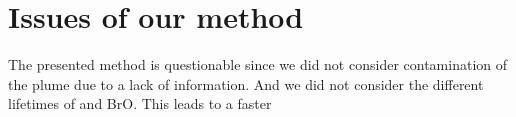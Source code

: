 \documentclass  [
  paper    = a4,
  BCOR     = 10mm,
  twoside,
  fontsize = 12pt,
  fleqn,
  toc      = bibnumbered,
  toc      = listofnumbered,
  numbers  = noendperiod,
  headings = normal,
  listof   = leveldown,
  version  = 3.03
]                                       {scrreprt}
\begin{document}
	\begin{small}	
%
%
 	
 \end{small}
	\chapter{Issues of our method}
	The presented method is questionable since we did not consider contamination of the plume due to a lack of information. And we did not consider the different lifetimes of  and BrO. This leads to a faster 
	
\end{document}
